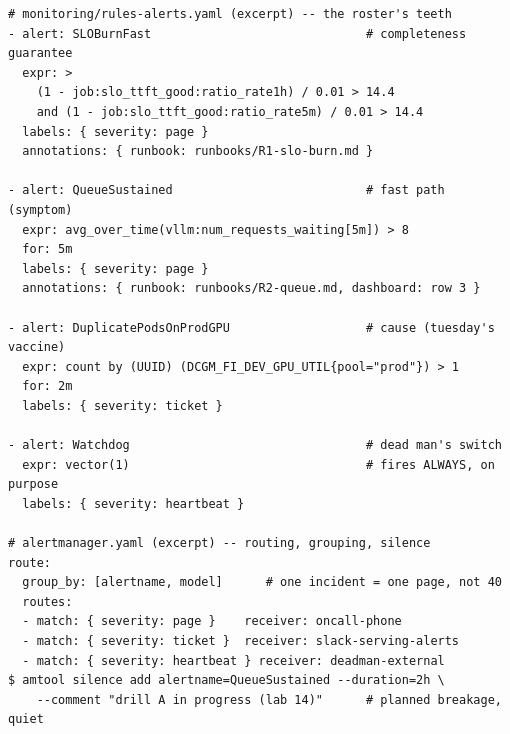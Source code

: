 \begin{terminalbox}
\begin{Verbatim}[breaklines=true,breakanywhere=true,fontsize=\small,formatcom=\color{tbbtermfg},codes=\tbbcodeactive]
# monitoring/rules-alerts.yaml (excerpt) -- the roster's teeth
- alert: SLOBurnFast                              # completeness guarantee
  expr: >
    (1 - job:slo_ttft_good:ratio_rate1h) / 0.01 > 14.4
    and (1 - job:slo_ttft_good:ratio_rate5m) / 0.01 > 14.4
  labels: { severity: page }
  annotations: { runbook: runbooks/R1-slo-burn.md }

- alert: QueueSustained                           # fast path (symptom)
  expr: avg_over_time(vllm:num_requests_waiting[5m]) > 8
  for: 5m
  labels: { severity: page }
  annotations: { runbook: runbooks/R2-queue.md, dashboard: row 3 }

- alert: DuplicatePodsOnProdGPU                   # cause (tuesday's vaccine)
  expr: count by (UUID) (DCGM_FI_DEV_GPU_UTIL{pool="prod"}) > 1
  for: 2m
  labels: { severity: ticket }

- alert: Watchdog                                 # dead man's switch
  expr: vector(1)                                 # fires ALWAYS, on purpose
  labels: { severity: heartbeat }

# alertmanager.yaml (excerpt) -- routing, grouping, silence
route:
  group_by: [alertname, model]      # one incident = one page, not 40
  routes:
  - match: { severity: page }    receiver: oncall-phone
  - match: { severity: ticket }  receiver: slack-serving-alerts
  - match: { severity: heartbeat } receiver: deadman-external
$ amtool silence add alertname=QueueSustained --duration=2h \
    --comment "drill A in progress (lab 14)"      # planned breakage, quiet
\end{Verbatim}
\end{terminalbox}

